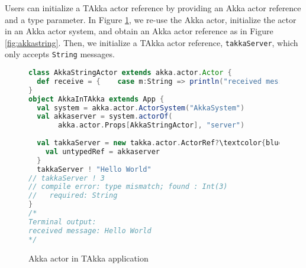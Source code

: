 Users can initialize a TAkka actor reference by providing an Akka actor 
reference and a type parameter.  In Figure \ref{akkaINtakka}, we re-use the 
Akka actor, initialize the actor in an Akka actor system, and obtain an Akka 
actor reference as in Figure \ref{fig:akkastring}.  Then, we initialize a TAkka 
actor reference, {\tt takkaServer}, which only accepts {\tt String} messages.

\begin{figure}[!h]
      \begin{lstlisting}[language=scala, escapechar=?]
class AkkaStringActor extends akka.actor.Actor {
  def receive = {    case m:String => println("received message: "+m)  }
}
object AkkaInTAkka extends App {
  val system = akka.actor.ActorSystem("AkkaSystem")
  val akkaserver = system.actorOf(
       akka.actor.Props[AkkaStringActor], "server")
  
  val takkaServer = new takka.actor.ActorRef?\textcolor{blue}{[String]}?{
    val untypedRef = akkaserver
  }
  takkaServer ! "Hello World"
// takkaServer ! 3 
// compile error: type mismatch; found : Int(3)
//   required: String
}
/*
Terminal output:
received message: Hello World
*/
    \end{lstlisting}
    \caption{Akka actor in TAkka application}
\label{akkaINtakka}    
\end{figure}


